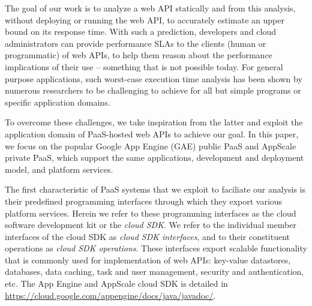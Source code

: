 The goal of our work is to analyze a web API statically and from this analysis, 
without deploying or running the web API, 
to accurately estimate an upper bound on its response time. With such a prediction,
developers and cloud administrators can provide performance SLAs to the clients (human or 
programmatic) of web APIs, to help them reason about 
the performance implications of their use -- something that is not possible today.
For general purpose applications, such worst-case execution time analysis has been shown
by numerous researchers to be challenging to achieve for all but 
simple programs or specific application domains.

To overcome these challenges, we take inspiration from the latter and exploit 
the application domain of PaaS-hosted web APIs to achieve our goal.  
In this paper, we focus on the popular Google App Engine (GAE) public PaaS 
and AppScale private PaaS, which support the same applications, 
development and deployment model, and platform services.

The first characteristic of PaaS systems
that we exploit to faciliate our analysis 
is their predefined programming interfaces 
through which they export various platform services. 
Herein we refer to these programming interfaces as the cloud software development 
kit or the \textit{cloud SDK}. We refer to the individual member interfaces of the cloud SDK
as \textit{cloud SDK interfaces}, and to their constituent operations 
as \textit{cloud SDK operations}.  These interfaces export scalable
functionality that is commonly used for implementation of web APIs:  
key-value datastores, databases,
data caching, task and user management, security and authentication, etc.
The App Engine and AppScale cloud SDK is detailed 
in \url{https://cloud.google.com/appengine/docs/java/javadoc/}. 


